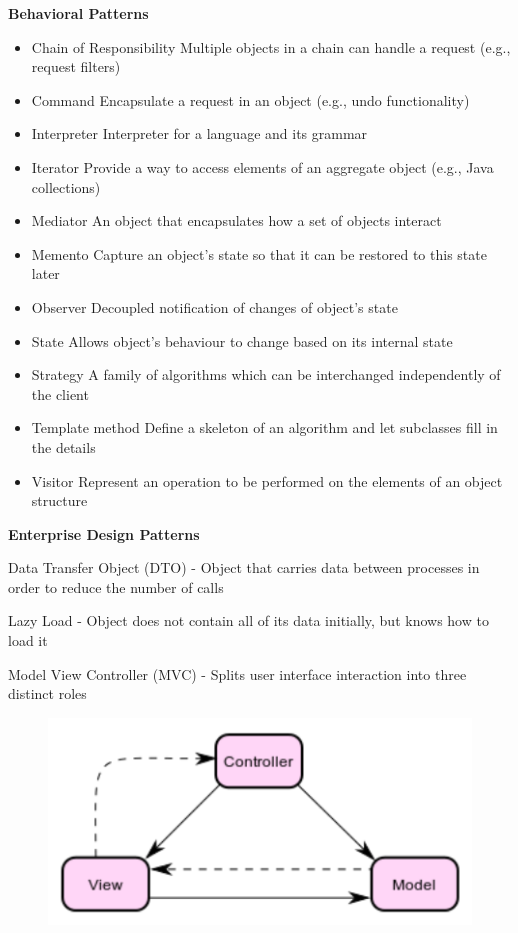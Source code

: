 \textbf{Behavioral Patterns}
\begin{itemize}
    \item Chain of Responsibility Multiple objects in a chain can handle a request (e.g., request filters)
    \item Command Encapsulate a request in an object (e.g., undo functionality)
    \item Interpreter Interpreter for a language and its grammar
    \item Iterator Provide a way to access elements of an aggregate object (e.g., Java collections)
    \item Mediator An object that encapsulates how a set of objects interact
    \item Memento Capture an object’s state so that it can be restored to this state later
    \item Observer Decoupled notification of changes of object’s state
    \item State Allows object’s behaviour to change based on its internal state
    \item Strategy A family of algorithms which can be interchanged independently of the client
    \item Template method Define a skeleton of an algorithm and let subclasses fill in the details
    \item Visitor Represent an operation to be performed on the elements of an object structure
\end{itemize}


\textbf{Enterprise Design Patterns}

Data Transfer Object (DTO) - Object that carries data between processes in order to reduce the number of calls

Lazy Load - Object does not contain all of its data initially, but knows how to load it

Model View Controller (MVC) - Splits user interface interaction into three distinct roles

\begin{figure}[ht!]
\centering
\includegraphics[width=.6\textwidth]{oborove/SWA/img/mvc.png}
\end{figure}


